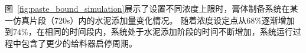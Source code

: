图~\ref{fig:paste_bound_simulation}展示了设置不同浓度上限时，膏体制备系统在某一仿真片段（720s）内的水泥添加量变化情况。
随着浓度设定点从$68\%$逐渐增加到$74\%$，在相同的时间段内，系统处于水泥添加阶段的时间不断增加，系统运行过程中包含了更少的给料器启停周期。

